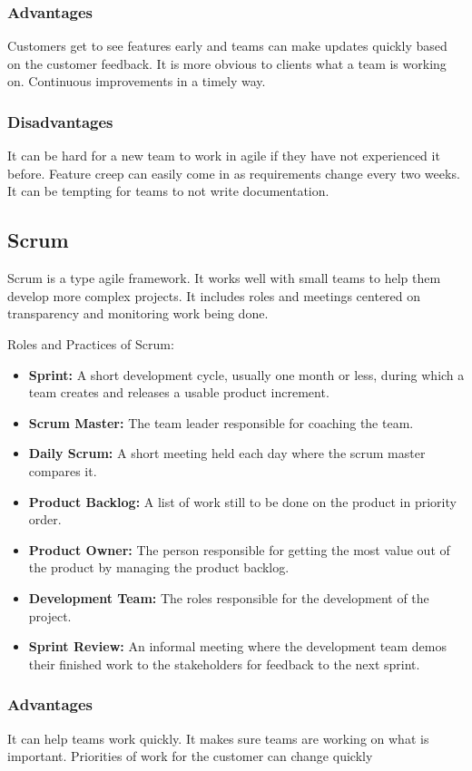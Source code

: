 \documentclass{article}
\begin{document}
\subsubsection{Advantages}
Customers get to see features early and teams can make updates quickly based on the customer feedback.
It is more obvious to clients what a team is working on.
Continuous improvements in a timely way.
\subsubsection{Disadvantages}
It can be hard for a new team to work in agile if they have not experienced it before.
Feature creep can easily come in as requirements change every two weeks.
It can be tempting for teams to not write documentation.

\subsection{Scrum}
Scrum is a type agile framework. It works well with small teams to help them develop more complex projects. It includes roles and meetings centered on transparency and monitoring work being done.

Roles and Practices of Scrum:
\begin{itemize}
    \item \textbf{Sprint:} A short development cycle, usually one month or less, during which a team creates and releases a usable product increment.
    \item \textbf{Scrum Master:} The team leader responsible for coaching the team.
    \item \textbf{Daily Scrum:} A short meeting held each day where the scrum master compares it.
    \item \textbf{Product Backlog:} A list of work still to be done on the product in priority order.
    \item \textbf{Product Owner:} The person responsible for getting the most value out of the product by managing the product backlog.
    \item \textbf{Development Team:} The roles responsible for the development of the project.
    \item \textbf{Sprint Review:} An informal meeting where the development team demos their finished work to the stakeholders for feedback to the next sprint.
\end{itemize}

\subsubsection{Advantages}
It can help teams work quickly. It makes sure teams are working on what is important. Priorities of work for the customer can change quickly
\end{document}
